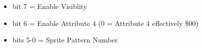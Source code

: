 \begin{itemize}
\item bit 7 = Enable Visiblity
\item bit 6 = Enable Attribute 4 (0 = Attribute 4 effectively \$00)
\item bits 5-0 = Sprite Pattern Number
\end{itemize}

